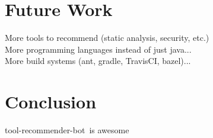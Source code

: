 \documentclass[conference]{IEEEtran}
\newcommand{\tool}{tool-recommender-bot}
\begin{document}
\section{Future Work}

More tools to recommend (static analysis, security, etc.) \\

More programming languages instead of just java...\\

More build systems (ant, gradle, TravisCI, bazel)...\\

\section{Conclusion}

\tool~is awesome




  
%

\end{document}
